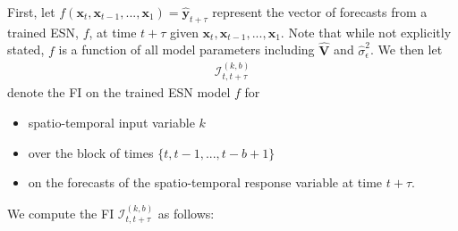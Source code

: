 \documentclass[AMS,STIX2COL]{WileyNJD-v2}
\begin{document}
First, let $f(\textbf{x}_t, \textbf{x}_{t-1},..., \textbf{x}_{1})=\hat{\textbf{y}}_{t+\tau}$ represent the vector of forecasts from a trained ESN, $f$, at time $t+\tau$ given $\textbf{x}_t, \textbf{x}_{t-1},..., \textbf{x}_{1}$. Note that while not explicitly stated, $f$ is a function of all model parameters including $\hat{\textbf{V}}$ and $\hat{\sigma}^2_{\epsilon}$. We then let
\begin{align}
    \mathcal{I}^{(k,b)}_{t,t+\tau}
\end{align} denote the FI on the trained ESN model $f$ for 
\begin{itemize}
    \item spatio-temporal input variable $k$ 
    \item over the block of times $\{t, t-1,..., t-b+1\}$
    \item on the forecasts of the spatio-temporal response variable at time $t+\tau$. 
\end{itemize}
We compute the FI $\mathcal{I}^{(k,b)}_{t,t+\tau}$ as follows:
\end{document}
